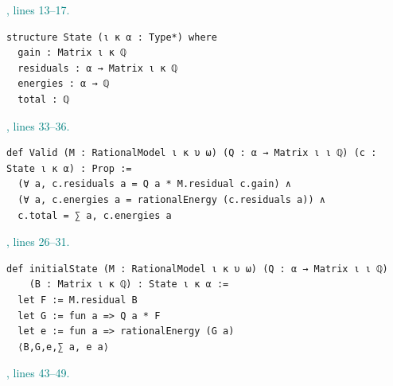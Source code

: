 \documentclass[11pt]{article}\usepackage{needspace}\renewcommand{\paperkind}{Lean companion}\setlength{\parskip}{0.35em}
\begin{document}
{\small\textcolor{teal}{, lines 13--17.}\par}

\begin{lstlisting}[style=BayesSource]
structure State (ι κ α : Type*) where
  gain : Matrix ι κ ℚ
  residuals : α → Matrix ι κ ℚ
  energies : α → ℚ
  total : ℚ
\end{lstlisting}



{\small\textcolor{teal}{, lines 33--36.}\par}

\begin{lstlisting}[style=BayesSource]
def Valid (M : RationalModel ι κ υ ω) (Q : α → Matrix ι ι ℚ) (c : State ι κ α) : Prop :=
  (∀ a, c.residuals a = Q a * M.residual c.gain) ∧
  (∀ a, c.energies a = rationalEnergy (c.residuals a)) ∧
  c.total = ∑ a, c.energies a
\end{lstlisting}



{\small\textcolor{teal}{, lines 26--31.}\par}

\begin{lstlisting}[style=BayesSource]
def initialState (M : RationalModel ι κ υ ω) (Q : α → Matrix ι ι ℚ)
    (B : Matrix ι κ ℚ) : State ι κ α :=
  let F := M.residual B
  let G := fun a => Q a * F
  let e := fun a => rationalEnergy (G a)
  ⟨B,G,e,∑ a, e a⟩
\end{lstlisting}



{\small\textcolor{teal}{, lines 43--49.}\par}
\end{document}
